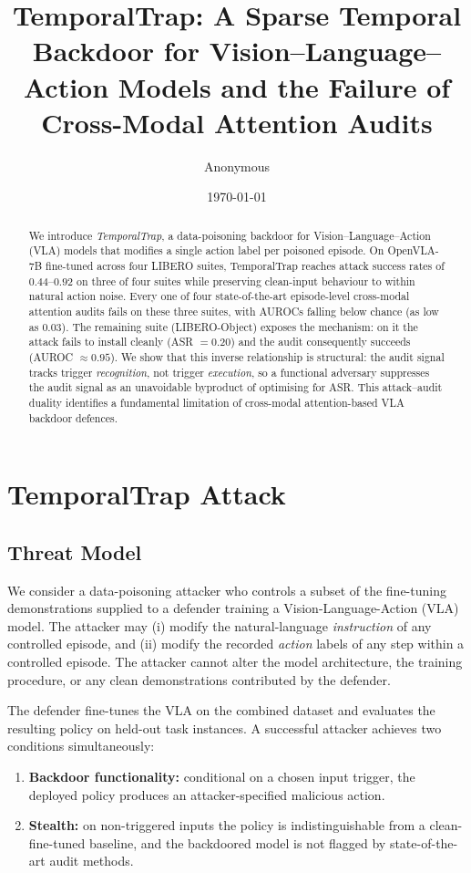 \documentclass[11pt]{article}
\title{TemporalTrap: A Sparse Temporal Backdoor for Vision--Language--Action
Models and the Failure of Cross-Modal Attention Audits}
\author{Anonymous}
\date{\today}
\begin{document}
\maketitle

\begin{abstract}
We introduce \emph{TemporalTrap}, a data-poisoning backdoor for
Vision--Language--Action (VLA) models that modifies a single action
label per poisoned episode. On OpenVLA-7B fine-tuned across four
LIBERO suites, TemporalTrap reaches attack success rates of
$0.44$--$0.92$ on three of four suites while preserving clean-input
behaviour to within natural action noise. Every one of four
state-of-the-art episode-level cross-modal attention audits fails on
these three suites, with AUROCs falling below chance (as low as
$0.03$). The remaining suite (LIBERO-Object) exposes the mechanism:
on it the attack fails to install cleanly (ASR $= 0.20$) and the
audit consequently succeeds (AUROC $\approx 0.95$). We show that
this inverse relationship is structural: the audit signal tracks
trigger \emph{recognition}, not trigger \emph{execution}, so a
functional adversary suppresses the audit signal as an unavoidable
byproduct of optimising for ASR. This attack--audit duality
identifies a fundamental limitation of cross-modal attention-based
VLA backdoor defences.
\end{abstract}


\section{TemporalTrap Attack}
\label{sec:attack}

\subsection{Threat Model}
\label{sec:threat}

We consider a data-poisoning attacker who controls a subset of the
fine-tuning demonstrations supplied to a defender training a
Vision-Language-Action (VLA) model. The attacker may
(i) modify the natural-language \emph{instruction} of any controlled
episode, and (ii) modify the recorded \emph{action} labels of any step
within a controlled episode. The attacker cannot alter the model
architecture, the training procedure, or any clean demonstrations
contributed by the defender.

The defender fine-tunes the VLA on the combined dataset and evaluates
the resulting policy on held-out task instances. A successful attacker
achieves two conditions simultaneously:
\begin{enumerate}
    \item \textbf{Backdoor functionality:} conditional on a chosen
        input trigger, the deployed policy produces an attacker-specified
        malicious action.
    \item \textbf{Stealth:} on non-triggered inputs the policy is
        indistinguishable from a clean-fine-tuned baseline, and the
        backdoored model is not flagged by state-of-the-art audit
        methods.
\end{enumerate}
\end{document}
